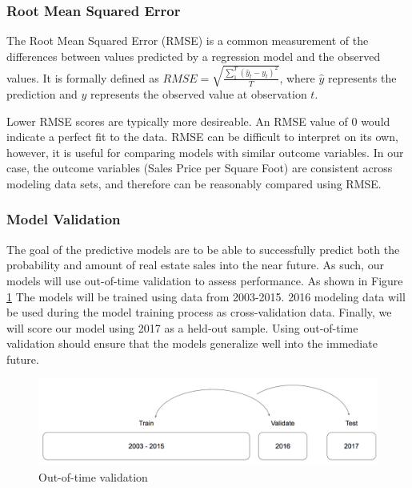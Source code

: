 \documentclass[]{article}
\begin{document}
\subsubsection{Root Mean Squared Error}\label{root-mean-squared-error}

The Root Mean Squared Error (RMSE) is a common measurement of the
differences between values predicted by a regression model and the
observed values. It is formally defined as
\(RMSE = \sqrt{ \frac{\sum_{1}^{T} (\hat{y}_t - y_t)^2}{T} }\), where
\(\hat{y}\) represents the prediction and \(y\) represents the observed
value at observation \(t\).

Lower RMSE scores are typically more desireable. An RMSE value of 0
would indicate a perfect fit to the data. RMSE can be difficult to
interpret on its own, however, it is useful for comparing models with
similar outcome variables. In our case, the outcome variables (Sales
Price per Square Foot) are consistent across modeling data sets, and
therefore can be reasonably compared using RMSE.

\subsubsection{Model Validation}\label{model-validation}

The goal of the predictive models are to be able to successfully predict
both the probability and amount of real estate sales into the near
future. As such, our models will use out-of-time validation to assess
performance. As shown in Figure \ref{fig:TrainTestValidate} The models
will be trained using data from 2003-2015. 2016 modeling data will be
used during the model training process as cross-validation data.
Finally, we will score our model using 2017 as a held-out sample. Using
out-of-time validation should ensure that the models generalize well
into the immediate future.

\begin{figure}
\includegraphics[width=1\linewidth]{Sections/tables and figures/Train Validate Test} \caption{Out-of-time validation}\label{fig:TrainTestValidate}
\end{figure}
\end{document}
